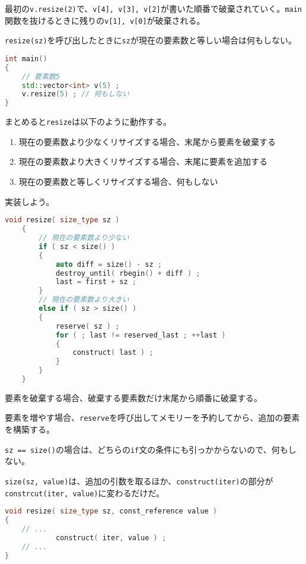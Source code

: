 最初の\texttt{v.resize(2)}で、\texttt{v[4], v[3], v[2]}が書いた順番で破棄されていく。\texttt{main}関数を抜けるときに残りの\texttt{v[1], v[0]}が破棄される。

\texttt{resize(sz)}を呼び出したときに\texttt{sz}が現在の要素数と等しい場合は何もしない。

\begin{lstlisting}[language={C++}]
int main()
{
    // 要素数5
    std::vector<int> v(5) ;
    v.resize(5) ; // 何もしない   
}
\end{lstlisting}

まとめると\texttt{resize}は以下のように動作する。

\begin{enumerate}
\def\labelenumi{\arabic{enumi}.}
\item
  現在の要素数より少なくリサイズする場合、末尾から要素を破棄する
\item
  現在の要素数より大きくリサイズする場合、末尾に要素を追加する
\item
  現在の要素数と等しくリサイズする場合、何もしない
\end{enumerate}

\ifTombow\pagebreak\fi
実装しよう。

\begin{lstlisting}[language={C++}]
    void resize( size_type sz )
    {
        // 現在の要素数より少ない
        if ( sz < size() )
        {
            auto diff = size() - sz ;
            destroy_until( rbegin() + diff ) ;
            last = first + sz ;
        }
        // 現在の要素数より大きい
        else if ( sz > size() )
        {
            reserve( sz ) ;
            for ( ; last != reserved_last ; ++last )
            {
                construct( last ) ;
            }
        }
    }
\end{lstlisting}

要素を破棄する場合、破棄する要素数だけ末尾から順番に破棄する。

要素を増やす場合、\texttt{reserve}を呼び出してメモリーを予約してから、追加の要素を構築する。

\texttt{sz == size()}の場合は、どちらの\texttt{if}文の条件にも引っかからないので、何もしない。

\texttt{size(sz, value)}は、追加の引数を取るほか、\texttt{construct(iter)}の部分が\texttt{constrcut(iter, value)}に変わるだけだ。

\begin{lstlisting}[language={C++}]
void resize( size_type sz, const_reference value )
{
    // ...
            construct( iter, value ) ;
    // ...
}
\end{lstlisting}


